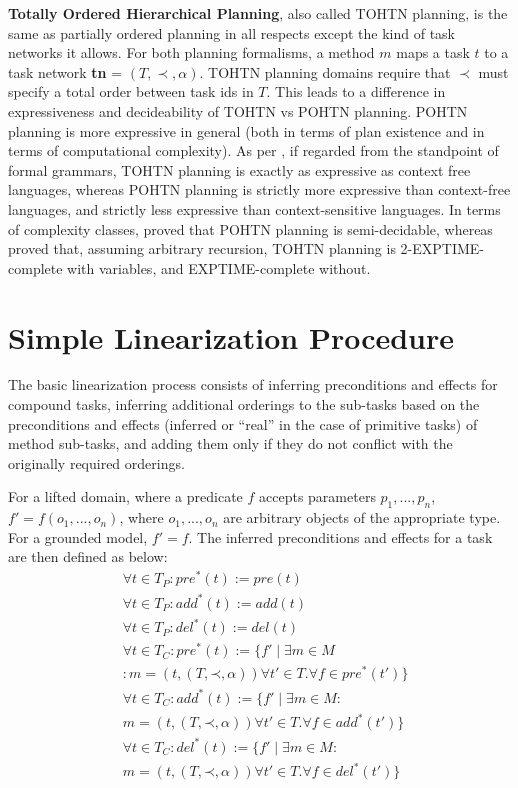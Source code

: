 \documentclass[letterpaper]{article}
\newcommand{\Pre} {\ensuremath{\mathit{pre}}}  %
\newcommand{\Add} {\ensuremath{\mathit{add}}}
\newcommand{\Del} {\ensuremath{\mathit{del}}}
\newcommand{\PreS} {\ensuremath{\mathit{pre^{*}}}}
\newcommand{\AddS} {\ensuremath{\mathit{add^{*}}}}
\newcommand{\DelS} {\ensuremath{\mathit{del^{*}}}}
\newcommand{\singlePrec} {\ensuremath{\mathit{ \mathord{\prec} }}}
\begin{document}
\textbf{Totally Ordered Hierarchical Planning}, also called TOHTN planning, is the same as partially ordered planning in all respects except the kind of task networks it allows.
For both planning formalisms, a method $m$ maps a task $t$ to a task network \textbf{tn} = $(T, \prec, \alpha)$. TOHTN planning domains require that $\prec$ must specify a total order between task ids in $T$.
This leads to a difference in expressiveness and decideability of TOHTN vs POHTN planning. POHTN planning is more expressive in general (both in terms of plan existence and in terms of computational complexity). As per \cite{LanguageClassificationPlanning}, if regarded from the standpoint of formal grammars, TOHTN planning is exactly as expressive as context free languages, whereas POHTN planning is strictly more expressive than context-free languages, and strictly less expressive than context-sensitive languages.
In terms of complexity classes, \cite{ErolHTNExpressivity} proved that POHTN planning is semi-decidable, whereas \cite{Alford2015TightHTNBounds} proved that, assuming arbitrary recursion, TOHTN planning is 2-EXPTIME-complete with variables, and EXPTIME-complete without. 


\section{Simple Linearization Procedure}
The basic linearization process consists of inferring preconditions and effects for compound tasks, inferring additional orderings to the sub-tasks based on the preconditions and effects (inferred or \enquote{real} in the case of primitive tasks) of method sub-tasks, and adding them only if they do not conflict with the originally required orderings.

For a lifted domain, where a predicate $f$ accepts parameters $p_1, ..., p_n$, 
$f' = f(o_1, ..., o_n)$, where $o_1, ..., o_n$ are arbitrary objects of the appropriate type. For a grounded model, $f' = f$. The inferred preconditions and effects for a task are then defined as below:
\begin{align*}
& \forall t \in T_P : \PreS(t) := \Pre(t) \\
& \forall t \in T_P : \AddS(t) := \Add(t) \\
& \forall t \in T_P : \DelS(t) := \Del(t)  \\ %
& \forall t \in T_C : \PreS(t) := \{f'  \mid  \exists m \in M  \\
								& : m=(t,(T, \singlePrec, \alpha)) \forall t' \in T.  \forall  f \in \PreS(t') \}   \\
& \forall t \in T_C : \AddS(t) := \{f'  \mid  \exists m \in M : \\
								& m=(t,(T, \singlePrec, \alpha)) \forall t' \in T.  \forall  f \in \AddS(t') \}   \\
& \forall t \in T_C : \DelS(t) := \{f'  \mid  \exists m \in M : \\
								& m=(t,(T, \singlePrec, \alpha)) \forall t' \in T.  \forall  f \in \DelS(t') \}   \\ 
\end{align*}
 
\end{document}
